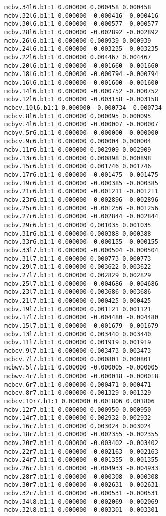 \begin{verbatim}
mcbv.34l6.b1:1 0.000000 0.000458 0.000458
mcbv.32l6.b1:1 0.000000 -0.000416 -0.000416
mcbv.30l6.b1:1 0.000000 -0.000577 -0.000577
mcbv.28l6.b1:1 0.000000 -0.002892 -0.002892
mcbv.26l6.b1:1 0.000000 0.000939 0.000939
mcbv.24l6.b1:1 0.000000 -0.003235 -0.003235
mcbv.22l6.b1:1 0.000000 0.004467 0.004467
mcbv.20l6.b1:1 0.000000 -0.001660 -0.001660
mcbv.18l6.b1:1 0.000000 -0.000794 -0.000794
mcbv.16l6.b1:1 0.000000 -0.001600 -0.001600
mcbv.14l6.b1:1 0.000000 -0.000752 -0.000752
mcbv.12l6.b1:1 0.000000 -0.003158 -0.003158
mcbcv.10l6.b1:1 0.000000 -0.000734 -0.000734
mcbcv.8l6.b1:1 0.000000 0.000095 0.000095
mcbyv.4l6.b1:1 0.000000 -0.000007 -0.000007
mcbyv.5r6.b1:1 0.000000 -0.000000 -0.000000
mcbcv.9r6.b1:1 0.000000 0.000004 0.000004
mcbv.11r6.b1:1 0.000000 0.002909 0.002909
mcbv.13r6.b1:1 0.000000 0.000898 0.000898
mcbv.15r6.b1:1 0.000000 0.001746 0.001746
mcbv.17r6.b1:1 0.000000 -0.001475 -0.001475
mcbv.19r6.b1:1 0.000000 -0.000385 -0.000385
mcbv.21r6.b1:1 0.000000 -0.001211 -0.001211
mcbv.23r6.b1:1 0.000000 -0.002896 -0.002896
mcbv.25r6.b1:1 0.000000 -0.001256 -0.001256
mcbv.27r6.b1:1 0.000000 -0.002844 -0.002844
mcbv.29r6.b1:1 0.000000 0.001035 0.001035
mcbv.31r6.b1:1 0.000000 0.000388 0.000388
mcbv.33r6.b1:1 0.000000 -0.000155 -0.000155
mcbv.33l7.b1:1 0.000000 -0.000504 -0.000504
mcbv.31l7.b1:1 0.000000 0.000773 0.000773
mcbv.29l7.b1:1 0.000000 0.003622 0.003622
mcbv.27l7.b1:1 0.000000 0.002829 0.002829
mcbv.25l7.b1:1 0.000000 -0.004686 -0.004686
mcbv.23l7.b1:1 0.000000 0.003686 0.003686
mcbv.21l7.b1:1 0.000000 0.000425 0.000425
mcbv.19l7.b1:1 0.000000 0.001121 0.001121
mcbv.17l7.b1:1 0.000000 -0.004480 -0.004480
mcbv.15l7.b1:1 0.000000 -0.001679 -0.001679
mcbv.13l7.b1:1 0.000000 0.003440 0.003440
mcbv.11l7.b1:1 0.000000 0.001919 0.001919
mcbcv.9l7.b1:1 0.000000 0.003473 0.003473
mcbcv.7l7.b1:1 0.000000 0.000801 0.000801
mcbwv.5l7.b1:1 0.000000 -0.000005 -0.000005
mcbwv.4r7.b1:1 0.000000 -0.000018 -0.000018
mcbcv.6r7.b1:1 0.000000 0.000471 0.000471
mcbcv.8r7.b1:1 0.000000 0.001329 0.001329
mcbcv.10r7.b1:1 0.000000 0.001806 0.001806
mcbv.12r7.b1:1 0.000000 0.000950 0.000950
mcbv.14r7.b1:1 0.000000 0.002932 0.002932
mcbv.16r7.b1:1 0.000000 0.003024 0.003024
mcbv.18r7.b1:1 0.000000 -0.002355 -0.002355
mcbv.20r7.b1:1 0.000000 -0.003402 -0.003402
mcbv.22r7.b1:1 0.000000 -0.002163 -0.002163
mcbv.24r7.b1:1 0.000000 -0.001355 -0.001355
mcbv.26r7.b1:1 0.000000 -0.004933 -0.004933
mcbv.28r7.b1:1 0.000000 -0.000308 -0.000308
mcbv.30r7.b1:1 0.000000 -0.002631 -0.002631
mcbv.32r7.b1:1 0.000000 -0.000531 -0.000531
mcbv.34l8.b1:1 0.000000 -0.002069 -0.002069
mcbv.32l8.b1:1 0.000000 -0.003301 -0.003301

\end{verbatim}
